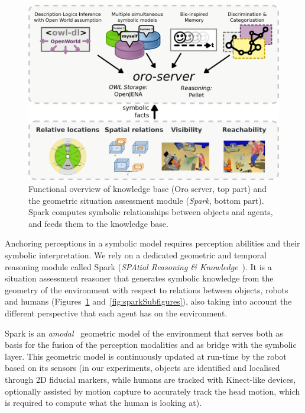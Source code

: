 \documentclass[preprint,3p,times]{elsarticle}
\begin{document}
\begin{figure}
        \centering
        \includegraphics[width=\columnwidth]{spark-oro.png}
    \caption{Functional overview of knowledge base ({\sc Oro} server, top part)
    and the geometric situation assessment module (\emph{{\sc Spark}}, bottom
    part). {\sc Spark} computes symbolic relationships between objects and
    agents, and feeds them to the knowledge base.}

        \label{fig|spark-oro}
\end{figure}

Anchoring perceptions in a symbolic model requires perception abilities and
their symbolic interpretation. We rely on a dedicated geometric and temporal
reasoning module called {\sc Spark} (\emph{SPAtial Reasoning \&
Knowledge}~\cite{Sisbot2011}). It is a situation assessment reasoner that
generates symbolic knowledge from the geometry of the environment with respect
to relations between objects, robots and humans (Figures~\ref{fig|spark-oro} and~\ref{fig:sparkSubfigures}),
also taking into account the different perspective that each agent has on the
environment.

{\sc Spark} is an \emph{amodal}~\cite{Mavridis2006} geometric model of the
environment that serves both as basis for the fusion of the perception
modalities and as bridge with the symbolic layer. This geometric model is
continuously updated at run-time by the robot based on its sensors (in our
experiments, objects are identified and localised through 2D fiducial markers, while
humans are tracked with Kinect-like devices, optionally assisted by motion
capture to accurately track the head motion, which is required to compute what
the human is looking at).
\end{document}
